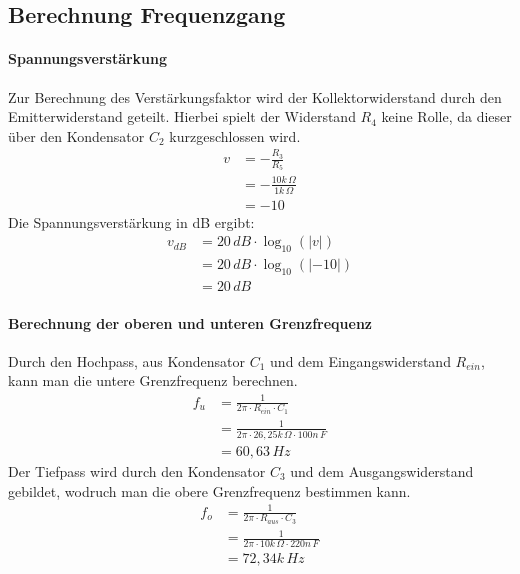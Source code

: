         \subsection{Berechnung Frequenzgang}
            \paragraph{Spannungsverstärkung}Zur Berechnung des Verstärkungsfaktor wird der Kollektorwiderstand durch den Emitterwiderstand geteilt. Hierbei spielt der Widerstand \(R_4\) keine Rolle, da dieser über den Kondensator \(C_2\) kurzgeschlossen wird.
            \begin{align*}
                v & = -\frac{R_3}{R_5}\\
                & = -\frac{10k\,\Omega}{1k\,\Omega}\\
                & = - 10
            \end{align*}
            Die Spannungsverstärkung in dB ergibt:
            \begin{align*}
                v_{dB} & = 20\,dB \cdot \log_{10}(\left\lvert v\right\rvert ) \\
                & = 20\,dB \cdot \log_{10}(\left\lvert -10\right\rvert ) \\
                & = 20\,dB 
            \end{align*}
            \paragraph{Berechnung der oberen und unteren Grenzfrequenz} Durch den Hochpass, aus Kondensator \(C_1\) und dem Eingangswiderstand \(R_{ein}\), kann man die untere Grenzfrequenz berechnen.
            \begin{align*}
                f_u&=\frac{1}{2\pi\cdot R_{ein}\cdot C_1}\\
                &=\frac{1}{2\pi\cdot26,25k\,\Omega \cdot 100n \,F}\\
                &=60,63\,Hz
            \end{align*}
            Der Tiefpass wird durch den Kondensator \(C_3\) und dem Ausgangswiderstand gebildet, wodruch man die obere Grenzfrequenz bestimmen kann.
            \begin{align*}
                f_o&=\frac{1}{2\pi\cdot R_{aus}\cdot C_3}\\
                &=\frac{1}{2\pi\cdot 10k\,\Omega \cdot 220n \,F}\\
                &=72,34k\,Hz
            \end{align*}
